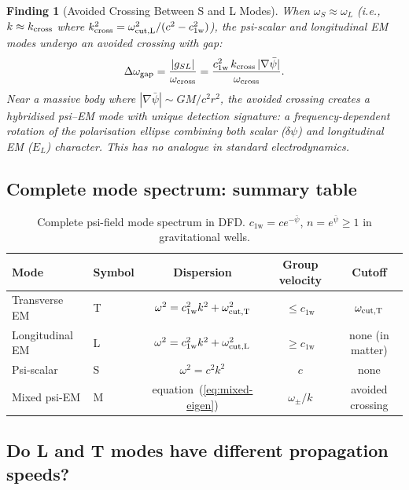 \documentclass[11pt]{article}
\newtheorem{finding}{Finding}
\newcommand{\cfield}{c_{1\mathrm{w}}}
\newcommand{\psibar}{\bar{\psi}}
\begin{document}
\begin{finding}[Avoided Crossing Between S and L Modes]
When $\omega_S \approx \omega_L$ (i.e., $k \approx k_{\rm cross}$ where
$k_{\rm cross}^2 = \omega_{\rm cut,L}^2/(c^2 - \cfield^2)$), the psi-scalar and
longitudinal EM modes undergo an avoided crossing with gap:
\begin{equation}
\Delta\omega_{\rm gap} = \frac{|g_{SL}|}{\omega_{\rm cross}}
= \frac{\cfield^2\,k_{\rm cross}\,|\nabla\psibar|}{\omega_{\rm cross}}.
\label{eq:gap}
\end{equation}
Near a massive body where $|\nabla\psibar| \sim GM/c^2 r^2$, the avoided
crossing creates a hybridised psi--EM mode with unique detection signature:
a frequency-dependent rotation of the polarisation ellipse combining
both scalar ($\delta\psi$) and longitudinal EM ($E_L$) character.
This has no analogue in standard electrodynamics.
\end{finding}

\subsection{Complete mode spectrum: summary table}

\begin{table}[h]
\centering
\caption{Complete psi-field mode spectrum in DFD.
$\cfield = ce^{-\psibar}$, $n = e^{\psibar} \geq 1$ in gravitational wells.}
\label{tab:modes}
\begin{tabular}{llccc}
\toprule
Mode & Symbol & Dispersion & Group velocity & Cutoff \\
\midrule
Transverse EM & T & $\omega^2 = \cfield^2 k^2 + \omega_{\rm cut,T}^2$ & $\leq \cfield$ & $\omega_{\rm cut,T}$ \\
Longitudinal EM & L & $\omega^2 = \cfield^2 k^2 + \omega_{\rm cut,L}^2$ & $\geq \cfield$ & none (in matter) \\
Psi-scalar & S & $\omega^2 = c^2 k^2$ & $c$ & none \\
Mixed psi-EM & M & equation~(\ref{eq:mixed-eigen}) & $\omega_\pm/k$ & avoided crossing \\
\bottomrule
\end{tabular}
\end{table}

\subsection{Do L and T modes have different propagation speeds?}
\end{document}
